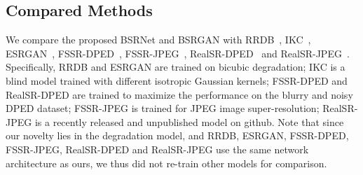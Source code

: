 \documentclass[10pt,twocolumn,letterpaper]{article}
\begin{document}
\subsection{Compared Methods}
We compare the proposed BSRNet and BSRGAN with RRDB~\cite{wang2018esrgan}, IKC~\cite{gu2019blind}, ESRGAN~\cite{wang2018esrgan}, FSSR-DPED~\cite{fritsche2019frequency}, FSSR-JPEG~\cite{fritsche2019frequency}, RealSR-DPED~\cite{ji2020real} and RealSR-JPEG~\cite{ji2020real}. Specifically, RRDB and ESRGAN are trained on bicubic degradation; IKC is a blind model trained with different isotropic Gaussian kernels; FSSR-DPED and RealSR-DPED are trained to maximize the performance on the blurry and noisy DPED dataset; FSSR-JPEG is trained for JPEG image super-resolution; RealSR-JPEG is a recently released and unpublished model on github.
Note that since our novelty lies in the degradation model, and RRDB, ESRGAN, FSSR-DPED, FSSR-JPEG, RealSR-DPED and RealSR-JPEG use the same network architecture as ours, we thus did not re-train other models for comparison.
\end{document}
